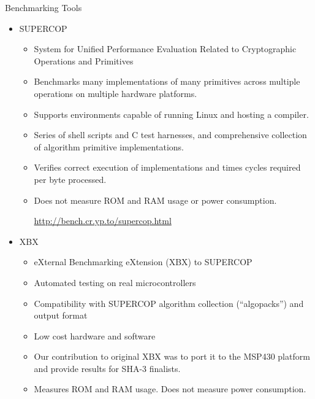 \documentclass[xcolor=pdftex,dvipsnames,table,final]{beamer}
\begin{document}
\begin{frame}[fragile]{}
\begin{columns}[t, totalwidth=\textwidth]
\begin{column}{.31\linewidth}
      \begin{block}{Benchmarking Tools}
        \begin{itemize}
          \item SUPERCOP
            \begin{itemize}
              \item System for Unified Performance Evaluation Related to Cryptographic Operations and Primitives
              \item Benchmarks many implementations of many primitives across multiple
                  operations on multiple hardware platforms.
              \item Supports environments capable of running Linux and hosting a
                  compiler.
              \item Series of shell scripts and C test harnesses, and comprehensive
                  collection of algorithm primitive implementations.
              \item Verifies correct execution of implementations and times cycles
                  required per byte processed.
              \item Does not measure ROM and RAM usage or power consumption.
              \begin{center}
                  \url{http://bench.cr.yp.to/supercop.html}
              \end{center}
            \end{itemize}
          \item XBX
            \begin{itemize}
              \item eXternal Benchmarking eXtension (XBX) to SUPERCOP
              \item Automated testing on real microcontrollers
              \item Compatibility with SUPERCOP algorithm collection (``algopacks'') and output format
              \item Low cost hardware and software
              \item Our contribution to original XBX was to port it to the MSP430
                  platform and provide results for SHA-3 finalists.
              \item Measures ROM and RAM usage. Does not measure power consumption.
            \end{itemize}
        \end{itemize}


\end{block}
\end{column}
\end{columns}
\end{frame}
\end{document}
